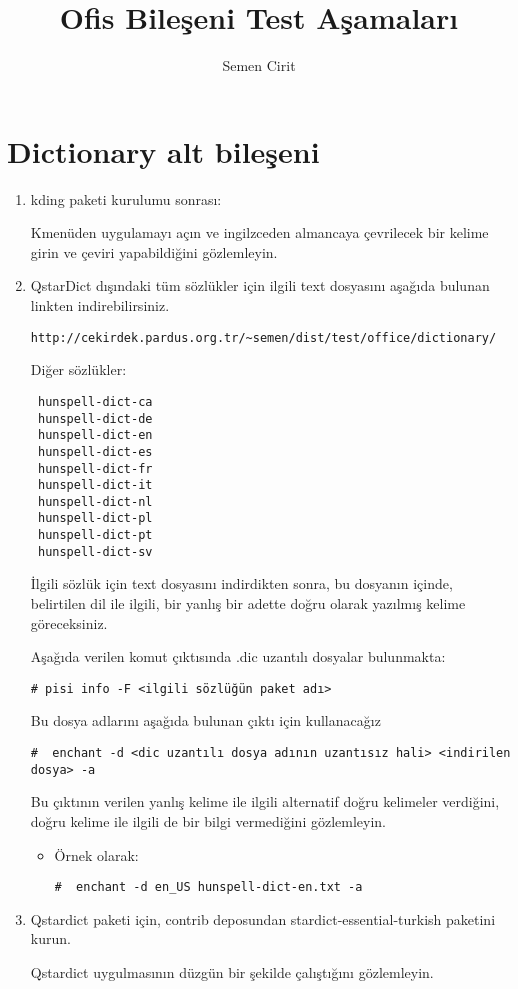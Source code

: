 \documentclass[a4paper,10pt]{article}
\title{Ofis Bileşeni Test Aşamaları}
\author{Semen Cirit}
\begin{document}
\maketitle
\section{Dictionary alt bileşeni}
\begin{enumerate}
 \item kding paketi kurulumu sonrası:

Kmenüden uygulamayı açın ve ingilzceden almancaya çevrilecek bir kelime girin ve çeviri yapabildiğini gözlemleyin.
 \item QstarDict dışındaki tüm sözlükler için ilgili text dosyasını aşağıda bulunan linkten indirebilirsiniz.
\begin{verbatim}
http://cekirdek.pardus.org.tr/~semen/dist/test/office/dictionary/
\end{verbatim}

Diğer sözlükler:
\begin{verbatim}
 hunspell-dict-ca
 hunspell-dict-de
 hunspell-dict-en
 hunspell-dict-es
 hunspell-dict-fr
 hunspell-dict-it
 hunspell-dict-nl
 hunspell-dict-pl
 hunspell-dict-pt
 hunspell-dict-sv
\end{verbatim}

İlgili sözlük için text dosyasını indirdikten sonra, bu dosyanın içinde, belirtilen dil ile ilgili, bir yanlış bir adette doğru olarak yazılmış kelime göreceksiniz.

Aşağıda verilen komut çıktısında .dic uzantılı dosyalar bulunmakta:
\begin{verbatim}
# pisi info -F <ilgili sözlüğün paket adı> 
\end{verbatim}

Bu dosya adlarını aşağıda bulunan çıktı için kullanacağız
\begin{verbatim}
#  enchant -d <dic uzantılı dosya adının uzantısız hali> <indirilen dosya> -a
\end{verbatim}

Bu çıktının verilen yanlış kelime ile ilgili alternatif doğru kelimeler verdiğini, doğru kelime ile ilgili de bir bilgi vermediğini gözlemleyin.

\begin{itemize}
 \item Örnek olarak: 
\begin{verbatim}
#  enchant -d en_US hunspell-dict-en.txt -a
\end{verbatim}

\end{itemize}
 \item Qstardict paketi için, contrib deposundan stardict-essential-turkish paketini kurun.

	Qstardict uygulmasının düzgün bir şekilde çalıştığını gözlemleyin.
\end{enumerate}
\end{document}
